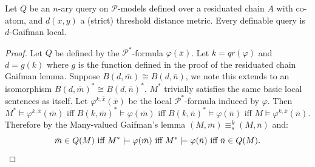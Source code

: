 \documentclass{lmcs} %
\newcommand{\?}{\ensuremath{\mkern0.4\thinmuskip}}
\let\isom=\cong%
\let\phi=\varphi
\newcommand{\CP}{\mathcal{P}}
\begin{document}
\begin{cor}
    Let $Q$ be an $n$-ary query on $\CP$-models defined over a residuated chain $A$ with co-atom, and $d(x,y)$ a (strict) threshold distance metric. Every definable query is $d$-Gaifman local.
\end{cor}
\begin{proof}
    Let $Q$ be defined by the $\CP^\ast$-formula $\phi(\bar{x})$. Let $k=qr(\phi)$ and $d=g(k)$ where $g$ is the function defined in the proof of the residuated chain Gaifman lemma. Suppose $B(d,\bar{m})\isom B(d,\bar{n})$, we note this extends to an isomorphism $B(d,\bar{m})^\ast\isom B(d,\bar{n})^\ast$. $M^\ast$ trivially satisfies the same basic local sentences as itself. Let $\phi^{k,\bar{x}}(\bar{x})$ be the local $\CP^\ast$-formula induced by $\phi$. Then $M^\ast\models\phi^{k,\bar{x}}(\bar{m})$ iff $B(k,\bar{m})^\ast\models\phi(\bar{m})$ iff $B(k,\bar{n})^\ast\models\phi(\bar{n})$ iff $M\models\phi^{k,\bar{x}}(\bar{n})$. Therefore by the Many-valued Gaifman's lemma $(M,\bar{m})\equiv^k_s (M,\bar{n})$ and: \[\bar{m}\in Q(M) \text{ iff }M^\ast\models\phi(\bar{m}) \text{ iff }M^\ast\models\phi(\bar{n}) \text{ iff }\bar{n}\in Q(M).\qedhere\]
\end{proof}
\end{document}
